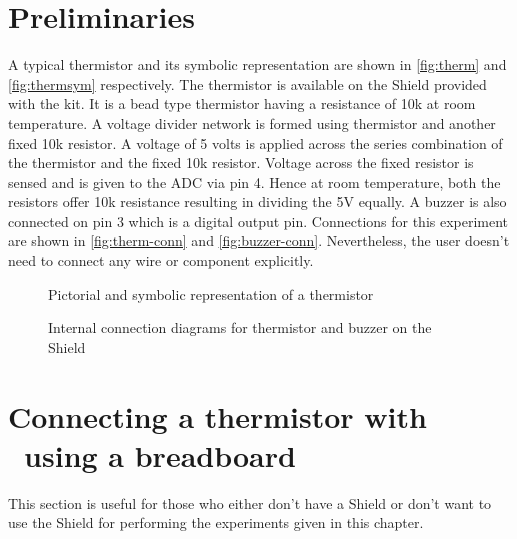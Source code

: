 \section{Preliminaries}
A typical thermistor and its symbolic representation are shown in
\ref{fig:therm} and \ref{fig:thermsym} respectively. The thermistor is
available on the Shield provided with the kit.  It is a bead type
thermistor having a resistance of 10k at room temperature. A voltage
divider network is formed using thermistor and another fixed 10k
resistor. A voltage of 5 volts is applied across the series
combination of the thermistor and the fixed 10k resistor. Voltage
across the fixed resistor is sensed and is given to the ADC via pin
4. Hence at room temperature, both the resistors offer 10k resistance
resulting in dividing the 5V equally. A buzzer is also connected on
pin 3 which is a digital output pin.
Connections for this experiment are shown in \ref{fig:therm-conn}
and \ref{fig:buzzer-conn}. Nevertheless, the user doesn't need to
connect any wire or component explicitly.


\begin{figure}
  \centering
   \hfill
  \caption{Pictorial and symbolic representation of a thermistor}
\end{figure}


\begin{figure}
  \centering
   \hfill
  \caption{Internal connection diagrams for thermistor and buzzer on the Shield}
\end{figure}

\section{Connecting a thermistor with \arduino\ using a breadboard}
This section is useful for those who either don't have a Shield or don't want to use the Shield
for performing the experiments given in this chapter.

